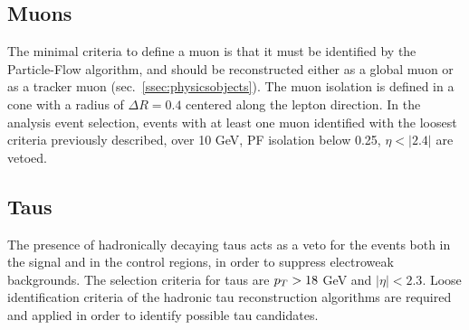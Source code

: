 
\subsection{Muons}\label{ssec:muons}


The minimal criteria to define a muon is that it must be identified by the Particle-Flow algorithm, and should be reconstructed either as a global muon or as a tracker muon (sec.~\ref{ssec:physicsobjects}). The muon isolation is defined in a cone with a radius of $\Delta R=0.4$ centered along the lepton direction. In the analysis event selection, events with at least one muon identified with the loosest criteria previously described, \pt over 10 GeV, PF isolation below 0.25, $\eta<|2.4|$ are vetoed.
 


\subsection{Taus}\label{ssec:tau}
The presence of hadronically decaying taus acts as a veto for the events both in the signal and in the control regions, in order to suppress electroweak backgrounds. The selection criteria for taus are $p_T > 18$ GeV and $|\eta| < 2.3$. Loose identification criteria of the hadronic tau reconstruction algorithms are required and applied in order to identify possible tau candidates.


